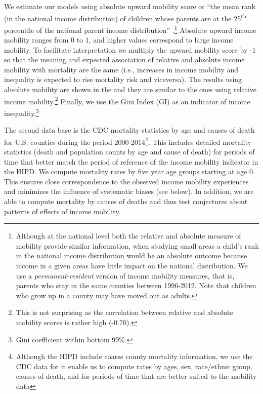 \documentclass[11pt]{article}
\begin{document}
We estimate our models using absolute upward mobility score or ``the mean rank (in the national income distribution) of children whose parents are at the 25\textsuperscript{th} percentile of the national parent income distribution'' \citep[p. 7]{Chetty2014}.\footnote{Although at the national level both the relative and absolute measure of mobility provide similar information, when studying small areas a child's rank in the national income distribution would be an absolute outcome because income in a given areas have little impact on the national distribution. We use a \textit{permanent-resident} version of income mobility measures, that is, parents who stay in the same counties between 1996-2012. Note that children who grow up in a county may have moved out as adults.}  Absolute upward income mobility ranges from 0 to 1, and higher values correspond to large income mobility. To facilitate interpretation we multiply the upward mobility score by -1 so that the meaning and expected association of relative and absolute income mobility with mortality are the same (i.e., increases in  income mobility and inequality is expected to rise mortality risk and viceversa). The results using absolute mobility are shown in the  and they are similar to the ones using relative income mobility.\footnote{This is not surprising as the correlation between relative and absolute mobility scores is rather high (-0.70).} Finally, we use the Gini Index (GI) as an indicator of income inequality.\footnote{Gini coefficient within bottom 99\%.}
 

The second data base is the CDC mortality statistics by age and causes of death for U.S. counties during the period 2000-2014\footnote{Although the HIPD include coarse county mortality information, we use the CDC data for it enable us to compute rates by ages, sex, race/ethnic group, causes of death, and for periods of time that are better suited to the mobility data}. This includes detailed mortality statistics (death and population counts by age and cause of death) for periods of time that better match the period of reference of the income mobility indicator in the HIPD. We compute mortality rates by five year age groups starting at age 0. This ensures close correspondence to the observed income mobility experiences and minimizes the influence of systematic biases (see below). In addition, we are able to compute mortality by causes of deaths and thus test conjectures about patterns of effects of income mobility.
\end{document}
